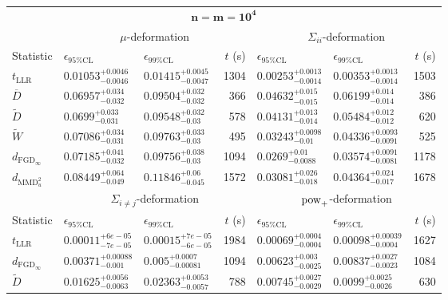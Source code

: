 \begin{tabular}{l|llr|llr}
	\toprule
	\multicolumn{7}{c}{$\mathbf{n=m=10^{4}}$} \\
	\multicolumn{1}{c}{} & \multicolumn{3}{c}{$\mu$-deformation} & \multicolumn{3}{c}{$\Sigma_{ii}$-deformation} \\
	Statistic & $\epsilon_{95\%\mathrm{CL}}$ & $\epsilon_{99\%\mathrm{CL}}$ & $t$ (s) & $\epsilon_{95\%\mathrm{CL}}$ & $\epsilon_{99\%\mathrm{CL}}$ & $t$ (s) \\
	\midrule
	$t_{\mathrm{LLR}}$ & $0.01053_{-0.0046}^{+0.0046}$ & $0.01415_{-0.0047}^{+0.0045}$ & 1304 & $0.00253_{-0.0014}^{+0.0013}$ & $0.00353_{-0.0014}^{+0.0013}$ & 1503 \\
	$\overline{D}$ & $0.06957_{-0.032}^{+0.034}$ & $0.09504_{-0.032}^{+0.032}$ & 366 & $0.04632_{-0.015}^{+0.015}$ & $0.06199_{-0.014}^{+0.014}$ & 386 \\
	$\widetilde{D}$ & $0.0699_{-0.031}^{+0.033}$ & $0.09548_{-0.03}^{+0.032}$ & 578 & $0.04131_{-0.014}^{+0.013}$ & $0.05484_{-0.012}^{+0.012}$ & 620 \\
	$\widetilde{W}$ & $0.07086_{-0.031}^{+0.034}$ & $0.09763_{-0.03}^{+0.033}$ & 495 & $0.03243_{-0.01}^{+0.0098}$ & $0.04336_{-0.0091}^{+0.0093}$ & 525 \\
	$d_{\mathrm{FGD}_{\infty}}$ & $0.07185_{-0.032}^{+0.041}$ & $0.09756_{-0.03}^{+0.038}$ & 1094 & $0.0269_{-0.0088}^{+0.01}$ & $0.03574_{-0.0081}^{+0.0091}$ & 1178 \\
	$d_{\mathrm{MMD}^{2}_{u}}$ & $0.08449_{-0.049}^{+0.064}$ & $0.11846_{-0.045}^{+0.06}$ & 1572 & $0.03081_{-0.018}^{+0.026}$ & $0.04364_{-0.017}^{+0.024}$ & 1678 \\
	\toprule
	\multicolumn{1}{c}{} & \multicolumn{3}{c}{$\Sigma_{i\neq j}$-deformation} & \multicolumn{3}{c}{$\rm{pow}_{+}$-deformation} \\
	Statistic & $\epsilon_{95\%\mathrm{CL}}$ & $\epsilon_{99\%\mathrm{CL}}$ & $t$ (s) & $\epsilon_{95\%\mathrm{CL}}$ & $\epsilon_{99\%\mathrm{CL}}$ & $t$ (s) \\
	\midrule
	$t_{\mathrm{LLR}}$ & $0.00011_{-7e-05}^{+6e-05}$ & $0.00015_{-6e-05}^{+7e-05}$ & 1984 & $0.00069_{-0.0004}^{+0.0004}$ & $0.00098_{-0.0004}^{+0.00039}$ & 1627 \\
	$d_{\mathrm{FGD}_{\infty}}$ & $0.00371_{-0.001}^{+0.00088}$ & $0.005_{-0.00081}^{+0.0007}$ & 1094 & $0.00623_{-0.0025}^{+0.003}$ & $0.00837_{-0.0023}^{+0.0027}$ & 1084 \\
	$\widetilde{D}$ & $0.01625_{-0.0063}^{+0.0056}$ & $0.02363_{-0.0057}^{+0.0053}$ & 788 & $0.00745_{-0.0029}^{+0.0027}$ & $0.0099_{-0.0026}^{+0.0025}$ & 630 \\

\end{tabular}
